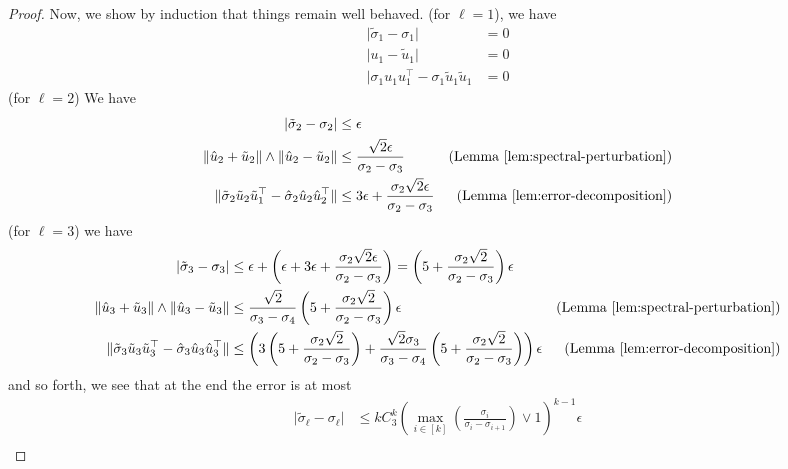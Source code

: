 \begin{proof}
    Now, we show by induction that things remain well behaved. (for $\ell = 1$), we have  
    \begin{align*}
        \vert \tilde{\sigma}_1 - \sigma_1 \vert & = 0  \\
        \vert u_1  - \tilde{u}_1 \vert & = 0 \\
        \vert \sigma_1  u_1 u_1^\top - \sigma_1 \tilde{u}_1 \tilde{u}_1 & = 0
    \end{align*}
    (for $\ell = 2$) We have 
    \begin{align}
        \vert \tilde{\sigma}_2 - \sigma_2 \vert & \le  \epsilon   \\
        \Vert \hat{u}_2 + \tilde{u}_2 \Vert \wedge \Vert \hat{u}_2 - \tilde{u}_2 \Vert & \le \frac{\sqrt{2} \epsilon}{\sigma_2 - \sigma_3} & (\text{Lemma \ref{lem:spectral-perturbation}})  \\
        \Vert \tilde{\sigma}_2 \tilde{u}_2 \tilde{u}_1^\top -  \hat{\sigma}_2  \hat{u}_2 \hat{u}_2^\top \Vert  & \le  3\epsilon + \frac{\sigma_2\sqrt{2} \epsilon }{\sigma_2 - \sigma_3} & (\text{Lemma \ref{lem:error-decomposition}})
    \end{align}
    (for $\ell = 3$) we have 
    \begin{align}
        \vert \tilde{\sigma}_3 - \sigma_3 \vert & \le  \epsilon + \left(\epsilon + 3\epsilon + \frac{\sigma_2\sqrt{2}\epsilon}{\sigma_2 - \sigma_3}\right) = \left( 5  + \frac{\sigma_2\sqrt{2}}{\sigma_2 - \sigma_3}\right) \epsilon \\
        \Vert \hat{u}_3 + \tilde{u}_3 \Vert \wedge \Vert \hat{u}_3 - \tilde{u}_3 \Vert & \le \frac{\sqrt{2} }{\sigma_3 - \sigma_4}  \left(5  + \frac{\sigma_2\sqrt{2}}{\sigma_2 - \sigma_3}\right) \epsilon  & (\text{Lemma \ref{lem:spectral-perturbation}})  \\
        \Vert \tilde{\sigma}_3 \tilde{u}_3 \tilde{u}_3^\top -  \hat{\sigma}_3  \hat{u}_3 \hat{u}_3^\top \Vert  & \le  \left(3 \left( 5  + \frac{\sigma_2\sqrt{2}}{\sigma_2 - \sigma_3}\right) + \frac{\sqrt{2} \sigma_3 }{\sigma_3 - \sigma_4}  \left(5  + \frac{\sigma_2\sqrt{2}}{\sigma_2 - \sigma_3}\right) \right) \epsilon & (\text{Lemma \ref{lem:error-decomposition}})
    \end{align}
    and so forth, we see that at the end the error is at most 
    \begin{align}
    \vert \tilde{\sigma}_\ell - \sigma_\ell \vert & \le  k C_3^k  \left(\max_{i \in [k]}\left(\frac{\sigma_i}{\sigma_i - \sigma_{i+1}}\right)\vee 1 \right)^{k-1}   \epsilon 
          \\ 

\end{align}
\end{proof}
